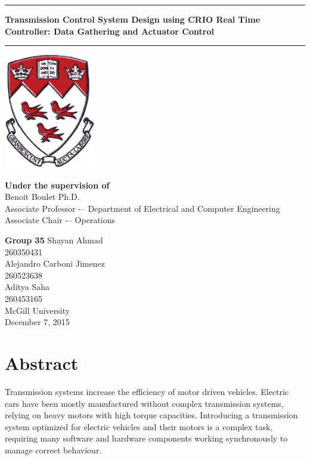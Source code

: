 \documentclass{article}
\begin{document}
\begin{titlepage}
    \centering
    \vfill
    \noindent\rule{15cm}{0.4pt}    
    \vskip0.2cm
    {\bfseries\Large
        Transmission Control System Design using CRIO Real Time Controller: Data Gathering and Actuator Control\\
    }        
    \vskip0.2cm
    \noindent\rule{15cm}{0.4pt}
    \vskip2cm
    \includegraphics[width=4cm]{mcgill_logo.png}
    
    \vskip2cm
    \textbf{Under the supervision of}\\
	\vskip0.2cm
    Benoit Boulet Ph.D.\\
	Associate Professor -– Department of Electrical and Computer Engineering\\
	Associate Chair -– Operations

    \vskip1.3cm
    \textbf{Group 35}
    \vskip0.2cm
      Shayan Ahmad\\
      260350431\\
    \vskip0.4cm
      Alejandro Carboni Jimenez\\
      260523638\\
    \vskip0.4cm
      Aditya Saha\\
      260453165\\
    \vskip0.5cm
	McGill University\\
    December 7, 2015
    \vfill
\end{titlepage}

\section{Abstract}
Transmission systems increase the efficiency of motor driven vehicles. Electric cars have been mostly manufactured without complex transmission systems, relying on heavy motors with high torque capacities. Introducing a transmission system optimized for electric vehicles and their motors is a complex task, requiring many software and hardware components working synchronously to manage correct behaviour. \\
\end{document}
